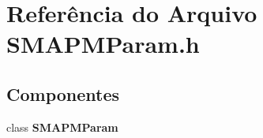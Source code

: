 \section{Referência do Arquivo S\+M\+A\+P\+M\+Param.\+h}
\label{_s_m_a_p_m_param_8h}
\subsection*{Componentes}
\begin{DoxyCompactItemize}
\item 
class {\bf S\+M\+A\+P\+M\+Param}
\end{DoxyCompactItemize}
